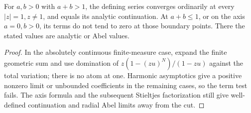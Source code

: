 \begin{corollary}\label{rw:cor:boundary}
For $a,b>0$ with $a+b>1$, the defining series converges ordinarily
at every $|z|=1,z\ne1$, and equals its analytic continuation. At
$a+b\le1$, or on the axis $a=0,b>0$, its terms do not tend to zero
at those boundary points. There the stated values are analytic or Abel values.
\end{corollary}
\begin{proof}
In the absolutely continuous finite-measure case, expand the finite geometric
sum and use domination of $z(1-(zu)^N)/(1-zu)$ against the total variation;
there is no atom at one. Harmonic asymptotics give a positive nonzero limit
or unbounded coefficients in the remaining cases, so the term test fails.
The axis formula and the subsequent Stieltjes factorization still give
well-defined continuation and radial Abel limits away from the cut.
\end{proof}
